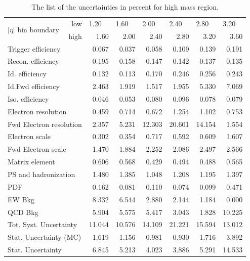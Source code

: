 \begin{table}
\centering
\begin{tabular}{l r r r r r r r}
\hline \hline
 \multirow{2}{*}{$|\eta|$ bin boundary} & low  & \multicolumn{1}{l}{1.20} & \multicolumn{1}{l}{1.60} & \multicolumn{1}{l}{2.00}
                                               & \multicolumn{1}{l}{2.40} & \multicolumn{1}{l}{2.80} & \multicolumn{1}{l}{3.20}  \\
                                        & high & 1.60  & 2.00  & 2.40  & 2.80  & 3.20  & 3.60  \\
\hline
\multicolumn{2}{l}{Trigger efficiency}            & 0.067 & 0.037 & 0.058 & 0.109 & 0.139 & 0.191  \\
\multicolumn{2}{l}{Recon. efficiency}             & 0.195 & 0.158 & 0.147 & 0.142 & 0.137 & 0.135  \\
\multicolumn{2}{l}{Id. efficiency}                & 0.132 & 0.113 & 0.170 & 0.246 & 0.256 & 0.243  \\
\multicolumn{2}{l}{Id.Fwd efficiency}             & 2.463 & 1.919 & 1.517 & 1.955 & 5.330 & 7.069  \\
\multicolumn{2}{l}{Iso. efficiency}               & 0.046 & 0.053 & 0.080 & 0.096 & 0.078 & 0.079  \\
\multicolumn{2}{l}{Electron resolution}           & 0.459 & 0.714 & 0.672 & 1.254 & 1.102 & 0.753  \\
\multicolumn{2}{l}{Fwd Electron resolution}       & 2.357 & 5.231 & 12.303 & 20.601 & 14.154 & 1.554  \\
\multicolumn{2}{l}{Electron scale}                & 0.302 & 0.354 & 0.717 & 0.592 & 0.609 & 1.607  \\
\multicolumn{2}{l}{Fwd Electron scale}            & 1.470 & 1.884 & 2.252 & 2.086 & 2.497 & 2.566  \\
\multicolumn{2}{l}{Matrix element}                & 0.606 & 0.568 & 0.429 & 0.494 & 0.488 & 0.565  \\
\multicolumn{2}{l}{PS and hadronization}          & 1.480 & 1.385 & 1.048 & 1.208 & 1.195 & 1.397  \\
\multicolumn{2}{l}{PDF}                           & 0.162 & 0.081 & 0.110 & 0.074 & 0.099 & 0.471  \\
\multicolumn{2}{l}{EW Bkg}                        & 8.332 & 6.544 & 2.880 & 2.144 & 1.184 & 0.000  \\
\multicolumn{2}{l}{QCD Bkg}                       & 5.904 & 5.575 & 5.417 & 3.043 & 1.828 & 10.225  \\
\hline
\multicolumn{2}{l}{Tot. Syst. Uncertainty}        & 11.044 & 10.576 & 14.109 & 21.221 & 15.594 & 13.012 \\
\hline
\multicolumn{2}{l}{Stat. Uncertainty (MC)}        & 1.619 & 1.156 & 0.981 & 0.930 & 1.716 & 3.892  \\
\multicolumn{2}{l}{Stat. Uncertainty}             & 6.845 & 5.213 & 4.023 & 3.886 & 5.291 & 14.533  \\
\hline \hline
\end{tabular}
\caption{The list of the uncertainties in percent for high mass region.}
\label{tab:Zee_unc_list_high}
\end{table}

